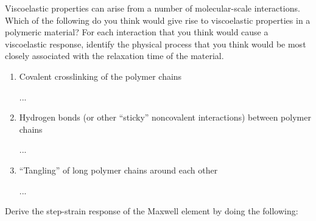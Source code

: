 \begin{activity}
\begin{ctqs}
\end{ctqs}
	

\begin{exercises}

		\exercise Viscoelastic properties can arise from a number of molecular-scale interactions.  Which of the following do you think would give rise to viscoelastic properties in a polymeric material?  For each interaction that you think would cause a viscoelastic response, identify the physical process that you think would be most closely associated with the relaxation time of the material.
		
			\begin{enumerate}
				\item Covalent crosslinking of the polymer chains
				
					\begin{solution}
					...
					\end{solution}
					
				\item Hydrogen bonds (or other ``sticky'' noncovalent interactions) between polymer chains
				
					\begin{solution}
					...
					\end{solution}
					
				\item ``Tangling'' of long polymer chains around each other
				
					\begin{solution}
					...
					\end{solution}
					
			\end{enumerate}
			
		
		
			
		\exercise \label{\labelbase:exc:maxwell} Derive the step-strain response of the Maxwell element by doing the following:
			

\end{exercises}
\end{activity}
